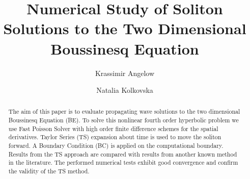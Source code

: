 \documentclass[11pt,a4paper,twoside]{article}
\begin{document}

\title{Numerical Study of Soliton Solutions to the Two Dimensional Boussinesq  Equation}




\author{Krassimir Angelow}
\address{Bulgarian Academy of Sciences, Institute of Mathematics and Informatics, ul. Acad. G. Bonchev, block 8, 1113 Sofia, Bulgaria}

\author{Natalia Kolkovska}
\address{Bulgarian Academy of Sciences, Institute of Mathematics and Informatics, ul. Acad. G. Bonchev, block 8, 1113 Sofia, Bulgaria}



\BeginPaper %


\newcommand{\ep}{\varepsilon}
\newcommand{\eps}[1]{{#1}_{\varepsilon}}
\newcommand{\rf}[1]{(\ref{#1})}
\newcommand{\RR}{\mathbb{R}}



\begin{abstract}
The aim of this paper is to evaluate propagating wave solutions to the two dimensional Boussinesq Equation (BE). To solve this nonlinear fourth order hyperbolic problem we use Fast Poisson Solver with high order finite difference schemes for the spatial derivatives. Taylor Series (TS) expansion about time is used to move the soliton forward. A Boundary Condition (BC) is applied on the computational boundary. Results from the TS approach are compared with results from another known method in the literature. The performed numerical tests exhibit good convergence and confirm the validity of the TS method.




\end{abstract}
\end{document}
